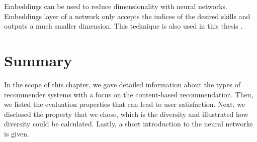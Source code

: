 Embeddings can be used to reduce dimensionality with neural networks. Embeddings layer of a network only accepts the indices of the desired skills and outputs a much smaller dimension. This technique is also used in this thesis \cite{gal2016theoretically}.





\section{Summary}


In the scope of this chapter, we gave detailed information about the types of recommender systems with a focus on the content-based recommendation. Then, we listed the evaluation properties that can lead to user satisfaction. Next, we disclosed the property that we chose, which is the diversity and illustrated how diversity could be calculated. Lastly, a short introduction to the neural networks is given.
